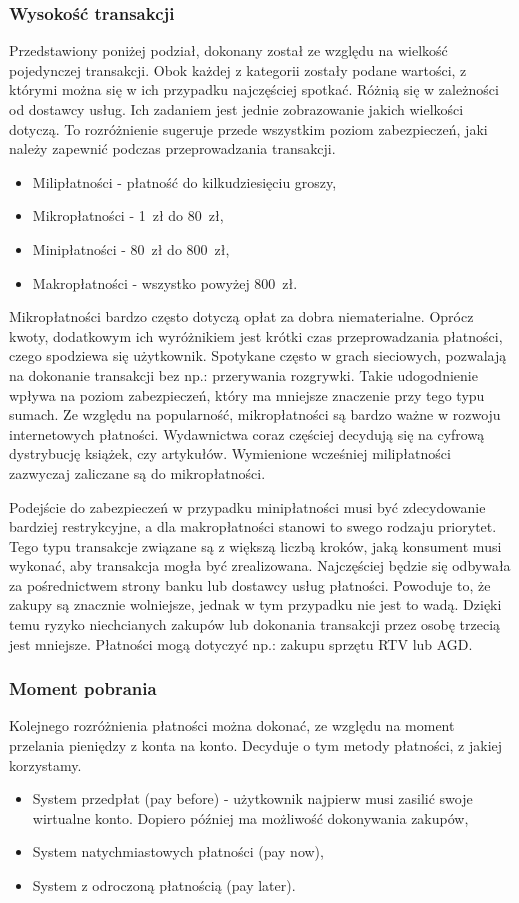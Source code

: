 \subsubsection*{Wysokość transakcji}
Przedstawiony poniżej podział, dokonany został ze względu na wielkość pojedynczej transakcji. Obok każdej z kategorii zostały podane wartości, z którymi można się w ich przypadku najczęściej spotkać. Różnią się w zależności od dostawcy usług. Ich zadaniem jest jednie zobrazowanie jakich wielkości dotyczą. To rozróżnienie sugeruje przede wszystkim poziom zabezpieczeń, jaki należy zapewnić podczas przeprowadzania transakcji.
\begin{itemize}
	\renewcommand{\labelitemi}{--}
	\item Milipłatności - płatność do kilkudziesięciu groszy,
	\item Mikropłatności - 1~zł do 80~zł,
	\item Minipłatności - 80~zł do 800~zł,
	\item Makropłatności - wszystko powyżej 800~zł. 
\end{itemize}
Mikropłatności bardzo często dotyczą opłat za dobra niematerialne. Oprócz kwoty, dodatkowym ich wyróżnikiem jest krótki czas przeprowadzania płatności, czego spodziewa się użytkownik. Spotykane często w grach sieciowych, pozwalają na dokonanie transakcji bez np.: przerywania rozgrywki. Takie udogodnienie wpływa na poziom zabezpieczeń, który ma mniejsze znaczenie przy tego typu sumach. Ze względu na popularność, mikropłatności są bardzo ważne w rozwoju internetowych płatności. Wydawnictwa coraz częściej decydują się na cyfrową dystrybucję książek, czy artykułów. Wymienione wcześniej milipłatności zazwyczaj zaliczane są do mikropłatności.

Podejście do zabezpieczeń w przypadku minipłatności musi być zdecydowanie bardziej restrykcyjne, a dla makropłatności stanowi to swego rodzaju priorytet. Tego typu transakcje związane są z większą liczbą kroków, jaką konsument musi wykonać, aby transakcja mogła być zrealizowana. Najczęściej będzie się odbywała za pośrednictwem strony banku lub dostawcy usług płatności. Powoduje to, że zakupy są znacznie wolniejsze, jednak w tym przypadku nie jest to wadą. Dzięki  temu ryzyko niechcianych zakupów lub dokonania transakcji przez osobę trzecią jest mniejsze. Płatności mogą dotyczyć np.: zakupu sprzętu RTV lub AGD.

\subsubsection*{Moment pobrania}
Kolejnego rozróżnienia płatności można dokonać, ze względu na moment przelania pieniędzy z konta na konto. Decyduje o tym metody płatności, z jakiej korzystamy.
\begin{itemize}
	\renewcommand{\labelitemi}{--}
	\item System przedpłat (pay before) - użytkownik najpierw musi zasilić swoje wirtualne konto. Dopiero później ma możliwość dokonywania zakupów,
	\item System natychmiastowych płatności (pay now),
	\item System z odroczoną płatnością (pay later).
\end{itemize}

